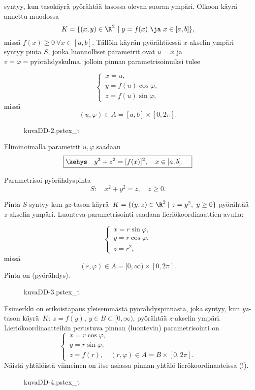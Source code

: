  syntyy, kun tasokäyrä pyörähtää tasossa olevan suoran ympäri. Olkoon
käyrä annettu muodossa
\[
K=\{(x,y)\in\R^2 \ | \ y=f(x) \ \ja \ x\in [a,b]\},
\]
missä $f(x)\geq 0 \ \forall x\in [a,b]$. Tällöin käyrän pyörähtäessä $x$-akselin ympäri syntyy 
pinta $S$, jonka luonnolliset parametrit ovat $u=x$ ja $v=\varphi=\text{pyörähdyskulma}$, 
jolloin pinnan parametrisoinniksi tulee
\begin{multicols}{2} \raggedcolumns
\[
\begin{cases}
\,x=u, \\
\,y=f(u)\cos\varphi, \\
\,z=f(u)\sin\varphi,
\end{cases}
\]
missä
\[
(u,\varphi)\in A=[a,b]\times [0,2\pi].
\]
\begin{figure}[H]
\begin{center}
{kuvaDD-2.pstex_t}
\end{center}
\end{figure}
\end{multicols}
Eliminoimalla parametrit $u,\varphi$ saadaan 
\[
\boxed{\kehys\quad y^2+z^2=[f(x)]^2,\quad x\in [a,b]. \quad}
\]
\begin{Exa} Parametrisoi pyörähdyspinta
\[
S: \quad x^2+y^2=z,\quad z\geq 0.
\] \end{Exa}
\ratk Pinta $S$ syntyy kun $yz$-tason käyrä $\,K=\{(y,z)\in\R^2 \mid z=y^2,\ y \ge 0\}$
pyörähtää $z$-akselin ympäri. Luonteva parametrisointi saadaan lieriökoordinaattien avulla:
\begin{multicols}{2} \raggedcolumns
\[
\begin{cases}
\,x=r\sin\varphi, \\
\,y=r\cos\varphi, \\
\,z=r^2,
\end{cases}
\]
missä
\[
(r,\varphi)\in A=[0,\infty)\times [0,2\pi].
\]
%
Pinta on (pyörähdys). \loppu
\begin{figure}[H]
\begin{center}
{kuvaDD-3.pstex_t}
\end{center}
\end{figure}
\end{multicols}
Esimerkki on erikoistapaus yleisemmästä pyörähdyspinnasta, joka syntyy, kun $yz$-tason 
käyrä \,$K:\ z=f(y),\ y \in B \subset [0,\infty)$, pyörähtää $z$-akselin ympäri.
Lieriökoordinaatteihin perustuva pinnan (luontevin) parametrisointi on
\[
\begin{cases}
\,x=r\cos\varphi, \\
\,y=r\sin\varphi, \\
\,z=f(r), \quad (r,\varphi) \in A = B \times [0,2\pi].
\end{cases}
\]
Näistä yhtälöistä viimeinen on itse asiassa pinnan yhtälö lierökoordinaateissa (!).
\begin{figure}[H]
\begin{center}
{kuvaDD-4.pstex_t}
\end{center}
\end{figure}

